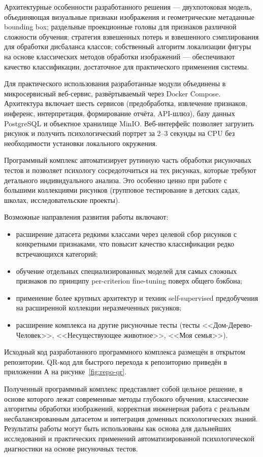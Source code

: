 Архитектурные особенности разработанного решения --- двухпотоковая модель, объединяющая визуальные признаки изображения и геометрические метаданные bounding box; раздельные проекционные головы для признаков различной сложности обучения; стратегия взвешенных потерь и взвешенного сэмплирования для обработки дисбаланса классов; собственный алгоритм локализации фигуры на основе классических методов обработки изображений --- обеспечивают качество классификации, достаточное для практического применения системы.

Для практического использования разработанные модули объединены в микросервисный веб-сервис, развёртываемый через Docker Compose. Архитектура включает шесть сервисов (предобработка, извлечение признаков, инференс, интерпретация, формирование отчёта, API-шлюз), базу данных PostgreSQL и объектное хранилище MinIO. Веб-интерфейс позволяет загрузить рисунок и получить психологический портрет за 2--3 секунды на CPU без необходимости установки локального окружения.

Программный комплекс автоматизирует рутинную часть обработки рисуночных тестов и позволяет психологу сосредоточиться на тех рисунках, которые требуют детального индивидуального анализа. Это особенно ценно при работе с большими коллекциями рисунков (групповое тестирование в детских садах, школах, исследовательские проекты).

Возможные направления развития работы включают:

\begin{itemize}
    \item расширение датасета редкими классами через целевой сбор рисунков с конкретными признаками, что повысит качество классификации редко встречающихся категорий;
    \item обучение отдельных специализированных моделей для самых сложных признаков по принципу per-criterion fine-tuning поверх общего бэкбона;
    \item применение более крупных архитектур и техник self-supervised предобучения на расширенной коллекции неразмеченных рисунков;
    \item расширение комплекса на другие рисуночные тесты (тесты <<Дом-Дерево-Человек>>, <<Несуществующее животное>>, <<Моя семья>>).
\end{itemize}

Исходный код разработанного программного комплекса размещён в открытом репозитории. QR-код для быстрого перехода к репозиторию приведён в приложении А на рисунке~\ref{fig:repo-qr}.

Полученный программный комплекс представляет собой цельное решение, в основе которого лежат современные методы глубокого обучения, классические алгоритмы обработки изображений, корректная инженерная работа с реальным несбалансированным датасетом и интеграция доменных психологических знаний. Результаты работы могут быть использованы как основа для дальнейших исследований и практических применений автоматизированной психологической диагностики на основе рисуночных тестов.
